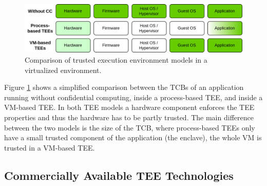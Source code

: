 \begin{figure}[H]
  \centering
  \includegraphics[width=\linewidth]{resources/tee-models-comparison.drawio.png}
  \caption{Comparison of trusted execution environment models in a virtualized environment.}
  \label{figure:cc-tee-comparison}
\end{figure}

Figure \ref{figure:cc-tee-comparison} shows a simplified comparison between the
TCBs of an application running without confidential computing, inside a
process-based TEE, and inside a VM-based TEE. In both TEE models a hardware
component enforces the TEE properties and thus the hardware has to be partly
trusted. The main difference between the two models is the size of the TCB,
where process-based TEEs only have a small trusted component of the application
(the enclave), the whole VM is trusted in a VM-based TEE.

\subsection{Commercially Available TEE Technologies}
\label{sec:commercial-tee-technologies}

